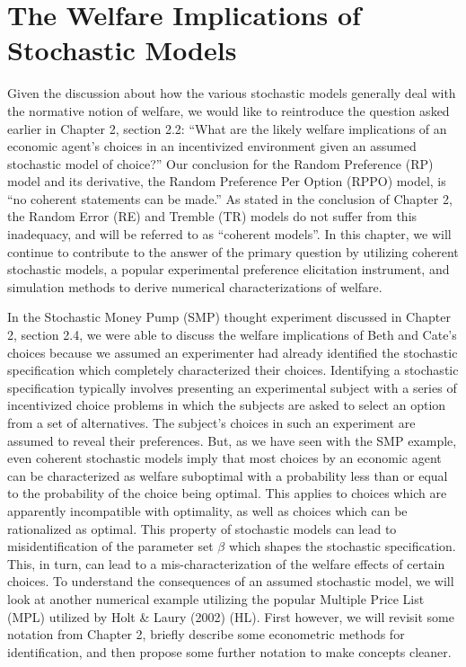 \documentclass[../main.tex]{subfiles}
\begin{document}
\onehalfspacing
\setcounter{chapter}{2}

\chapter{The Welfare Implications of Stochastic Models}

\lltoc %

Given the discussion about how the various stochastic models generally deal with the normative notion of welfare, we would like to reintroduce the question asked earlier in Chapter 2, section 2.2: 
\enquote{What are the likely welfare implications of an economic agent's choices in an incentivized environment given an assumed stochastic model of choice?}
Our conclusion for the Random Preference (RP) model and its derivative, the Random Preference Per Option (RPPO) model, is \enquote{no coherent statements can be made.}
As stated in the conclusion of Chapter 2, the Random Error (RE) and Tremble (TR) models do not suffer from this inadequacy, and will be referred to as \enquote{coherent models}. 
In this chapter, we will continue to contribute to the answer of the primary question by utilizing coherent stochastic models, a popular experimental preference elicitation instrument, and simulation methods to derive numerical characterizations of welfare.

In the Stochastic Money Pump (SMP) thought experiment discussed in Chapter 2, section 2.4, we were able to discuss the welfare implications of Beth and Cate's choices because we assumed an experimenter had already identified the stochastic specification which completely characterized their choices.
Identifying a stochastic specification typically involves presenting an experimental subject with a series of incentivized choice problems in which the subjects are asked to select an option from a set of alternatives.
The subject's choices in such an experiment are assumed to reveal their preferences.
But, as we have seen with the SMP example, even coherent stochastic models imply that most choices by an economic agent can be characterized as welfare suboptimal with a probability less than or equal to the probability of the choice being optimal.
This applies to choices which are apparently incompatible with optimality, as well as choices which can be rationalized as optimal.
This property of stochastic models can lead to misidentification of the parameter set $\beta$ which shapes the stochastic specification.
This, in turn, can lead to a mis-characterization of the welfare effects of certain choices.
To understand the consequences of an assumed stochastic model, we will look at another numerical example utilizing the popular Multiple Price List (MPL) utilized by Holt \& Laury (2002) (HL).
First however, we will revisit some notation from Chapter 2, briefly describe some econometric methods for identification, and then propose some further notation to make concepts cleaner.
\end{document}
